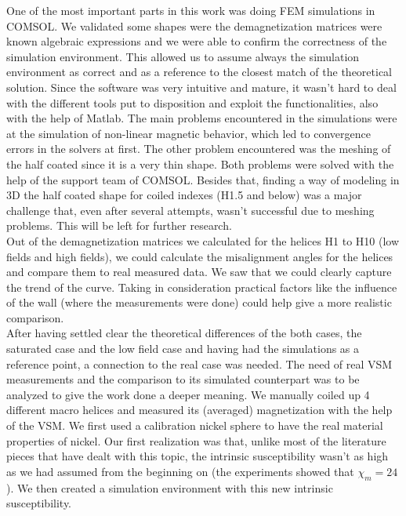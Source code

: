One of the most important parts in this work was doing FEM simulations in COMSOL. We validated some shapes were the demagnetization matrices were known algebraic expressions and we were able to confirm the correctness of the simulation environment. This allowed us to assume always the simulation environment as correct and as a reference to the closest match of the theoretical solution. Since the software was very intuitive and mature, it wasn't hard to deal with the different tools put to disposition and exploit the functionalities, also with the help of Matlab. The main problems encountered in the simulations were at the simulation of non-linear magnetic behavior, which led to convergence errors in the solvers at first. The other problem encountered was the meshing of the half coated since it is a very thin shape. Both problems were solved with the help of the support team of COMSOL. Besides that, finding a way of modeling in 3D the half coated shape for coiled indexes (H1.5 and below) was a major challenge that, even after several attempts, wasn't successful due to meshing problems. This will be left for further research.\\

Out of the demagnetization matrices we calculated for the helices H1 to H10 (low fields and high fields), we could calculate the misalignment angles for the helices and compare them to real measured data. We saw that we could clearly capture the trend of the curve. Taking in consideration practical factors like the influence of the wall (where the measurements were done) could help give a more realistic comparison.\\

After having settled clear the theoretical differences of the both cases, the saturated case and the low field case and having had the simulations as a reference point, a connection to the real case was needed. The need of real VSM measurements and the comparison to its simulated counterpart was to be analyzed to give the work done a deeper meaning. We manually coiled up 4 different macro helices and measured its (averaged) magnetization with the help of the VSM. We first used a calibration nickel sphere to have the real material properties of nickel. Our first realization was that, unlike most of the literature pieces that have dealt with this topic, the intrinsic susceptibility wasn't as high as we had assumed from the beginning on (the experiments showed that $\chi_m = 24$). We then created a simulation environment with this new intrinsic susceptibility.\\

